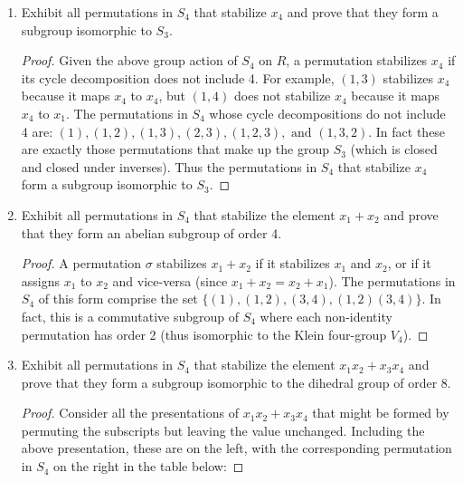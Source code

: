 \documentclass{article}
\begin{document}
\begin{enumerate}[label=(\alph*)]
\begin{proof}
            as desired. Thus the definitions give a group action of $S_4$ on $R$.
          \end{proof}
    \item Exhibit all permutations in $S_4$ that stabilize $x_4$ and prove that they form a subgroup isomorphic to $S_3$.
          \begin{proof}
            Given the above group action of $S_4$ on $R$, a permutation stabilizes $x_4$ if its cycle decomposition does not include 4. For example, $(1, 3)$ stabilizes $x_4$ because it maps $x_4$ to $x_4$, but $(1, 4)$ does not stabilize $x_4$ because it maps $x_4$ to $x_1$. The permutations in $S_4$ whose cycle decompositions do not include 4 are: $(1), (1, 2), (1, 3), (2, 3), (1, 2, 3), \text{ and } (1, 3, 2)$. In fact these are exactly those permutations that make up the group $S_3$ (which is closed and closed under inverses). Thus the permutations in $S_4$ that stabilize $x_4$ form a subgroup isomorphic to $S_3$.
          \end{proof}
    \item Exhibit all permutations in $S_4$ that stabilize the element $x_1 + x_2$ and prove that they form an abelian subgroup of order 4.
          \begin{proof}
            A permutation $\sigma$ stabilizes $x_1 + x_2$ if it stabilizes $x_1$ and $x_2$, or if it assigns $x_1$ to $x_2$ and vice-versa (since $x_1 + x_2 = x_2 + x_1$). The permutations in $S_4$ of this form comprise the set $\{ (1), (1, 2), (3, 4), (1, 2)(3, 4) \}$. In fact, this is a commutative subgroup of $S_4$ where each non-identity permutation has order 2 (thus isomorphic to the Klein four-group $V_4$).
          \end{proof}
    \item Exhibit all permutations in $S_4$ that stabilize the element $x_1 x_2 + x_3 x_4$ and prove that they form a subgroup isomorphic to the dihedral group of order 8.
          \begin{proof}
            Consider all the presentations of $x_1 x_2 + x_3 x_4$ that might be formed by permuting the subscripts but leaving the value unchanged. Including the above presentation, these are on the left, with the corresponding permutation in $S_4$ on the right in the table below:


\end{proof}
\end{enumerate}
\end{document}
